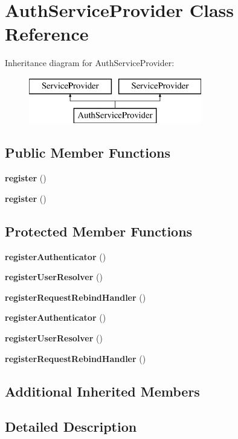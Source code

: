 \section{Auth\+Service\+Provider Class Reference}
\label{class_illuminate_1_1_auth_1_1_auth_service_provider}
Inheritance diagram for Auth\+Service\+Provider\+:\begin{figure}[H]
\begin{center}
\leavevmode
\includegraphics[height=2.000000cm]{class_illuminate_1_1_auth_1_1_auth_service_provider}
\end{center}
\end{figure}
\subsection*{Public Member Functions}
\begin{DoxyCompactItemize}
\item 
{\bf register} ()
\item 
{\bf register} ()
\end{DoxyCompactItemize}
\subsection*{Protected Member Functions}
\begin{DoxyCompactItemize}
\item 
{\bf register\+Authenticator} ()
\item 
{\bf register\+User\+Resolver} ()
\item 
{\bf register\+Request\+Rebind\+Handler} ()
\item 
{\bf register\+Authenticator} ()
\item 
{\bf register\+User\+Resolver} ()
\item 
{\bf register\+Request\+Rebind\+Handler} ()
\end{DoxyCompactItemize}
\subsection*{Additional Inherited Members}


\subsection{Detailed Description}


